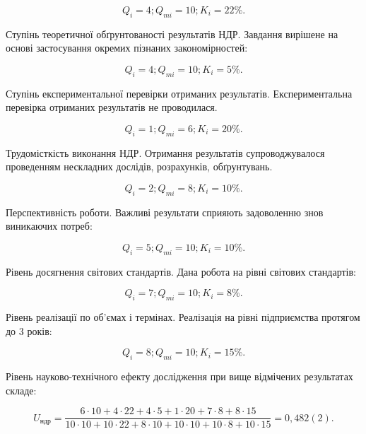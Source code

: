 \begin{equation}
Q_i = 4; Q_{mi} = 10; K_i = 22\%. \nonumber
\end{equation}

Ступінь теоретичної обґрунтованості результатів НДР. Завдання вирішене на основі застосування окремих пізнаних закономірностей:

\begin{equation}
Q_i = 4; Q_{mi} = 10; K_i = 5\%. \nonumber
\end{equation}

Ступінь експериментальної перевірки отриманих результатів. Експериментальна перевірка отриманих результатів не проводилася.

\begin{equation}
Q_i = 1; Q_{mi} = 6; K_i = 20\%. \nonumber
\end{equation}

Трудомісткість виконання НДР. Отримання результатів супроводжувалося проведенням нескладних дослідів, розрахунків, обґрунтувань.

\begin{equation}
Q_i = 2; Q_{mi} = 8; K_i = 10\%. \nonumber
\end{equation}

Перспективність роботи. Важливі результати сприяють задоволенню знов виникаючих потреб:

\begin{equation}
Q_i = 5; Q_{mi} = 10; K_i = 10\%. \nonumber
\end{equation}

Рівень досягнення світових стандартів. Дана робота на рівні світових стандартів:

\begin{equation}
Q_i = 7; Q_{mi} = 10; K_i = 8\%. \nonumber
\end{equation}

Рівень реалізації по об'ємах і термінах. Реалізація на рівні підприємства протягом до 3 років:

\begin{equation}
Q_i = 8; Q_{mi} = 10; K_i = 15\%. \nonumber
\end{equation}

Рівень науково-технічного ефекту дослідження при вище відмічених результатах складе:

\begin{equation}
U_{\text{ндр}} = \frac{6  \cdot  10+4  \cdot  22+4  \cdot  5+1  \cdot  20+7  \cdot  8+8  \cdot  15}{10  \cdot  10+10  \cdot  22+8  \cdot  10+10  \cdot  10+10  \cdot  8+10  \cdot  15} = 0,482(2). \nonumber
\end{equation}
